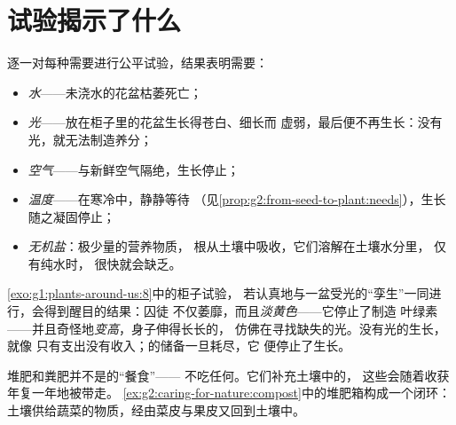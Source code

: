 \section{试验揭示了什么}

\begin{proposition}[植物的需要]\label{prop:g4:what-plants-need:needs}
逐一对每种需要进行公平试验，结果表明需要：
\begin{itemize}
  \item \emph{水}——未浇水的花盆枯萎死亡；
  \item \emph{光}——放在柜子里的花盆生长得苍白、细长而
        虚弱，最后便不再生长：没有光，就无法制造养分；
  \item \emph{空气}——与新鲜空气隔绝，生长停止；
  \item \emph{温度}——在寒冷中，静静等待
        （见\cref{prop:g2:from-seed-to-plant:needs}），生长
        随之凝固停止；
  \item \emph{无机盐}：极少量的营养物质，
        根从土壤中吸收，它们溶解在土壤水分里，
        仅有纯水时，
        很快就会缺乏。
\end{itemize}
\end{proposition}
\admitted

\begin{example}[苍白的“囚徒”]\label{ex:g4:what-plants-need:pale}
\cref{exo:g1:plants-around-us:8}中的柜子试验，
若认真地与一盆受光的“孪生”一同进行，会得到醒目的结果：囚徒
不仅萎靡，而且\emph{淡黄色}——它停止了制造
叶绿素——并且奇怪地\emph{变高}，身子伸得长长的，
仿佛在寻找缺失的光。没有光的生长，就像
只有支出没有收入；的储备一旦耗尽，它
便停止了生长。
\end{example}

\begin{remark}[园丁为什么要给土壤施肥]\label{rem:g4:what-plants-need:soil}
堆肥和粪肥并不是的“餐食”——
不吃任何。它们补充土壤中的，
这些会随着收获年复一年地被带走。
\cref{ex:g2:caring-for-nature:compost}中的堆肥箱构成一个闭环：
土壤供给蔬菜的物质，经由菜皮与果皮又回到土壤中。
\end{remark}

